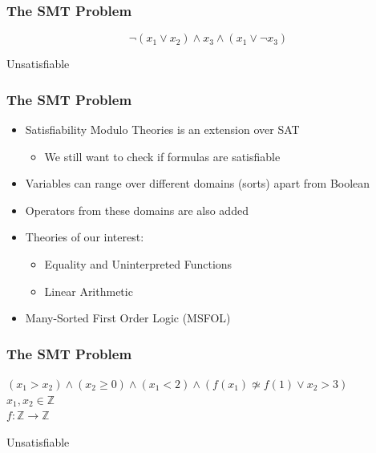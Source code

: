 \documentclass[usepdftitle=false,aspectratio=169,usenames,dvipsnames]{beamer}
\newcommand\vitem{\vfill\item}
\begin{document}
\begin{frame}
  \frametitle{The SMT Problem}
  \begin{overprint}
    \medskip
    $$\neg (x_{1} \vee x_{2}) \wedge x_{3} \wedge (x_{1} \vee \neg x_{3})$$
  \end{overprint}
  \vfill
  \begin{overprint}
    \begin{center}
      \color{red}Unsatisfiable
    \end{center}
  \end{overprint}
\end{frame}

\begin{frame}
  \frametitle{The SMT Problem}
  \begin{itemize}
    \item Satisfiability Modulo Theories is an extension over SAT
    \begin{itemize}
      \item We still want to check if formulas are satisfiable
    \end{itemize}
    \vitem Variables can range over different domains (sorts) apart from Boolean
    \vitem Operators from these domains are also added
    \vitem Theories of our interest:
    \begin{itemize}
      \item Equality and Uninterpreted Functions
      \item Linear Arithmetic
    \end{itemize}
    \vitem Many-Sorted First Order Logic (MSFOL)
  \end{itemize}
\end{frame}

\begin{frame}
  \frametitle{The SMT Problem}
  \begin{overprint}
    \medskip
    \begin{center}
      $(x_{1} > x_{2}) \wedge (x_{2} \ge 0) \wedge (x_{1} < 2) \wedge (f(x_{1}) \not\simeq f(1) \vee x_{2} > 3)$ \\

      $x_{1}, x_{2} \in \mathbb{Z}$ \\

      $f : \mathbb{Z} \rightarrow \mathbb{Z}$
    \end{center}
  \end{overprint}
  \vfill
  \begin{overprint}
    \begin{center}
      \color{red}Unsatisfiable
    \end{center}
  \end{overprint}
\end{frame}
\end{document}
